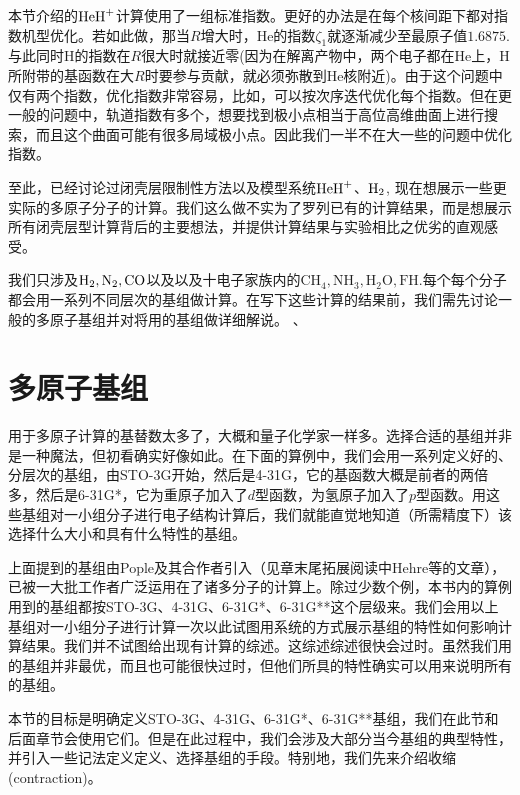 本节介绍的$\mathrm{HeH}^+$计算使用了一组标准指数。更好的办法是在每个核间距下都对指数机型优化。若如此做，那当$R$增大时，$\text{He}$的指数$\zeta_1$就逐渐减少至最原子值$1.6875$. 与此同时$\text{H}$的指数在$R$很大时就接近零(因为在解离产物中，两个电子都在$\text{He}$上，$\text{H}$所附带的基函数在大$R$时要参与贡献，就必须弥散到$\text{He}$核附近)。由于这个问题中仅有两个指数，优化指数非常容易，比如，可以按次序迭代优化每个指数。但在更一般的问题中，轨道指数有多个，想要找到极小点相当于高位高维曲面上进行搜索，而且这个曲面可能有很多局域极小点。因此我们一半不在大一些的问题中优化指数。

至此，已经讨论过闭壳层限制性\hft 方法以及模型系统$\mathrm{HeH}^+$、$\mathrm{H}_2$, 现在想展示一些更实际的多原子分子的计算。我们这么做不实为了罗列已有的计算结果，而是想展示所有闭壳层\hft 型计算背后的主要想法，并提供计算结果与实验相比之优劣的直观感受。

我们只涉及$\mathrm{H}_2, \text{N}_2, \text{CO}$以及以及十电子家族内的$\text{CH}_4, \text{NH}_3, \text{H$_2$O}, \text{FH}$.每个每个分子都会用一系列不同层次的基组做计算。在写下这些计算的结果前，我们需先讨论一般的多原子基组并对将用的基组做详细解说。
、
\section{多原子基组}
用于多原子计算的基替数太多了，大概和量子化学家一样多。选择合适的基组并非是一种魔法，但初看确实好像如此。在下面的算例中，我们会用一系列定义好的、分层次的基组，由STO-3G开始，然后是4-31G，它的基函数大概是前者的两倍多，然后是6-31G*，它为重原子加入了$d$型函数，为氢原子加入了$p$型函数。用这些基组对一小组分子进行电子结构计算后，我们就能直觉地知道（所需精度下）该选择什么大小和具有什么特性的基组。

上面提到的基组由Pople及其合作者引入（见章末尾拓展阅读中Hehre等的文章），已被一大批工作者广泛运用在了诸多分子的计算上。除过少数个例，本书内的算例用到的基组都按STO-3G、4-31G、6-31G*、6-31G**这个层级来。我们会用以上基组对一小组分子进行计算一次以此试图用系统的方式展示基组的特性如何影响计算结果。我们并不试图给出现有计算的综述。这综述综述很快会过时。虽然我们用的基组并非最优，而且也可能很快过时，但他们所具的特性确实可以用来说明所有的基组。

本节的目标是明确定义STO-3G、4-31G、6-31G*、6-31G**基组，我们在此节和后面章节会使用它们。但是在此过程中，我们会涉及大部分当今基组的典型特性，并引入一些记法定义定义、选择基组的手段。特别地，我们先来介绍收缩(contraction)。
